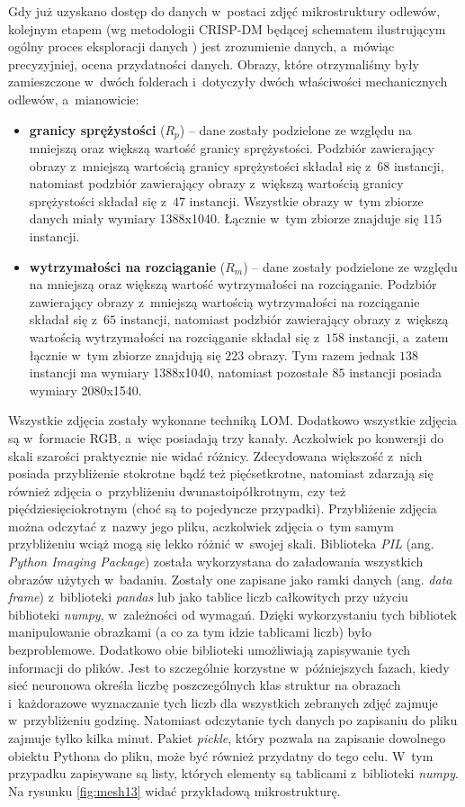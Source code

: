 Gdy już uzyskano dostęp do danych w~postaci zdjęć mikrostruktury odlewów, kolejnym etapem (wg metodologii CRISP-DM będącej schematem ilustrującym ogólny proces eksploracji danych \cite{Watson00}) jest zrozumienie danych, a~mówiąc precyzyjniej, ocena przydatności danych. 
Obrazy, które otrzymaliśmy były zamieszczone w~dwóch folderach i~dotyczyły dwóch właściwości mechanicznych odlewów, a~mianowicie:
\begin{itemize}
	\item \textbf{granicy sprężystości} ($R_p$) – dane zostały podzielone ze względu na mniejszą oraz większą wartość granicy sprężystości. Podzbiór zawierający obrazy z~mniejszą wartością granicy sprężystości składał się z~$68$ instancji, natomiast podzbiór zawierający obrazy z~większą wartością granicy sprężystości składał się z~$47$ instancji. Wszystkie obrazy w~tym zbiorze danych miały wymiary 1388x1040. Łącznie w~tym zbiorze znajduje się $115$ instancji.
	\item \textbf{wytrzymałości na rozciąganie} ($R_{m}$) – dane zostały podzielone ze względu na mniejszą oraz większą wartość wytrzymałości na rozciąganie. Podzbiór zawierający obrazy z~mniejszą wartością wytrzymałości na rozciąganie składał się z~$65$ instancji, natomiast podzbiór zawierający obrazy z~większą wartością wytrzymałości na rozciąganie składał się z~$158$ instancji, a~zatem łącznie w~tym zbiorze znajdują się $223$ obrazy. Tym razem jednak $138$ instancji ma wymiary 1388x1040, natomiast pozostałe $85$ instancji posiada wymiary 2080x1540.
\end{itemize}
Wszystkie zdjęcia zostały wykonane techniką LOM. Dodatkowo wszystkie zdjęcia są w~formacie RGB, a~więc posiadają trzy kanały. Aczkolwiek po konwersji do skali szarości praktycznie nie widać różnicy. Zdecydowana większość z~nich posiada przybliżenie stokrotne bądź też pięćsetkrotne, natomiast zdarzają się również zdjęcia o~przybliżeniu dwunastoipółkrotnym, czy też pięćdziesięciokrotnym (choć są to pojedyncze przypadki). Przybliżenie zdjęcia można odczytać z~nazwy jego pliku, aczkolwiek zdjęcia o~tym samym przybliżeniu wciąż mogą się lekko różnić w~swojej skali. Biblioteka \textit{PIL} (ang. \textit{Python Imaging Package}) została wykorzystana do załadowania wszystkich obrazów użytych w~badaniu. Zostały one zapisane jako ramki danych (ang. \textit{data frame}) z~biblioteki \textit{pandas} lub jako tablice liczb całkowitych przy użyciu biblioteki \textit{numpy}, w~zależności od wymagań. Dzięki wykorzystaniu tych bibliotek manipulowanie obrazkami (a co za tym idzie tablicami liczb) było bezproblemowe. Dodatkowo obie biblioteki umożliwiają zapisywanie tych informacji do plików. Jest to szczególnie korzystne w~późniejszych fazach, kiedy sieć neuronowa określa liczbę poszczególnych klas struktur na obrazach i~każdorazowe wyznaczanie tych liczb dla wszystkich zebranych zdjęć zajmuje w~przybliżeniu godzinę. Natomiast odczytanie tych danych po zapisaniu do pliku zajmuje tylko kilka minut. Pakiet \textit{pickle}, który pozwala na zapisanie dowolnego obiektu Pythona do pliku, może być również przydatny do tego celu. W~tym przypadku zapisywane są listy, których elementy są tablicami z~biblioteki \textit{numpy}. Na rysunku \ref{fig:mesh13} widać przykładową mikrostrukturę.
